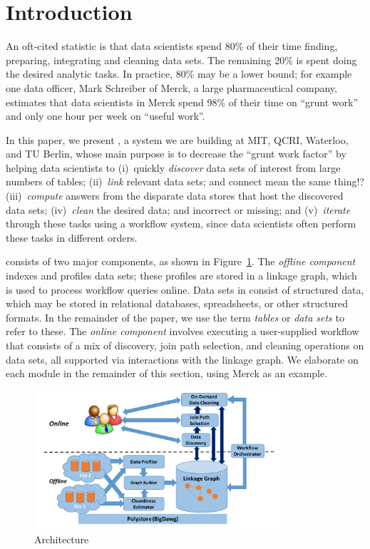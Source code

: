 \section{Introduction}
\label{introduction}

An oft-cited statistic is that data scientists spend 80\% of their time finding,
preparing, integrating and cleaning data sets. The remaining 20\% is spent doing
the desired analytic tasks. In practice, 80\% may be a lower bound; for example
one data officer, Mark Schreiber of Merck, a large pharmaceutical company,
estimates that data scientists in Merck spend 98\% of their time on ``grunt
work'' and only one hour per week on ``useful work''.

In this paper, we present \dcv, a system we are building at MIT, QCRI, Waterloo,
and TU Berlin, whose main purpose is to decrease the ``grunt work factor'' by
helping data scientists to (i)~quickly {\it discover} data sets of interest from
large numbers of tables; (ii)~{\it link} relevant data sets; %
and connect mean the same thing!?  (iii)~{\it compute} answers from the
disparate data stores that host the discovered data sets; (iv)~{\it clean} the
desired data; and %
incorrect or missing; and (v)~{\it iterate} through these tasks using a workflow
system, since data scientists often perform these tasks %
in different orders.


\dcv consists of two major components, as shown in Figure~\ref{fig:arch}.  The
{\it offline component} indexes and profiles data sets;  these profiles are
stored  in a linkage graph, which is used to process workflow queries online.
Data sets in \dcv consist of structured data, which may be stored in relational
databases, spreadsheets, or other structured formats. In the remainder of the
paper, we use the term {\it tables} or {\it data sets} to refer to these.  The
{\it online component} involves executing a user-supplied workflow that consists
of a mix of discovery, join path selection, and cleaning operations on data
sets, all supported via interactions with the linkage graph. We elaborate on
each module in the remainder of this section, using Merck as an example.


\begin{figure}[!t]
\includegraphics[width=3.6in]{arch3.pdf}
\caption{\dcv Architecture}
\label{fig:arch}
\end{figure}


